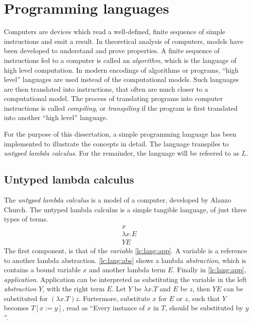 \documentclass[11pt,oneside,a4paper]{report}
\begin{document}
\chapter{Programming languages}
Computers are devices which read a well-defined, finite sequence of simple instructions and emit a result.
In theoretical analysis of computers, models have been developed to understand and prove properties.
A finite sequence of instructions fed to a computer is called an \textit{algorithm}, which is the language of high level computation\cite{copeland1997church}.
In modern encodings of algorithms or programs, ``high level'' languages are used instead of the computational models.
Such languages are then translated into instructions, that often are much closer to a computational model.
The process of translating programs into computer instructions is called \textit{compiling}, or \textit{transpiling} if the program is first translated into another ``high level'' language.

For the purpose of this dissertation, a simple programming language has been implemented to illustrate the concepts in detail.
The language transpiles to \textit{untyped lambda calculus}.
For the remainder, the language will be refeered to as $L$.

\section{Untyped lambda calculus}
The \textit{untyped lambda calculus} is a model of a computer, developed by Alanzo Church\cite{church1936unsolvable}.
The untyped lambda calculus is a simple tangible language, of just three types of terms.
\begin{align}
  &x
  \label{lc:lang:var}\\
  &\lambda x . E
  \label{lc:lang:abs}\\
  &Y E
  \label{lc:lang:app}
\end{align}
The first component, is that of the \textit{variable} \autoref{lc:lang:app}.
A variable is a reference to another lambda abstraction.
\autoref{lc:lang:abs} shows a lambda \textit{abstraction}, which is contains a bound variable $x$ and another lambda term $E$.
Finally in \autoref{lc:lang:app}, \textit{application}.
Application can be interpreted as substituting the variable in the left \textit{abstraction} $Y$, with the right term $E$.
Let $Y$ be $\lambda x . T$ and $E$ be $z$, then $Y E$ can be substituted for $(\lambda x . T) z$.
Furtermore, substitute $x$ for $E$ or $z$, such that $Y$ becomes $T[x := y]$, read as ``Every instance of $x$ in $T$, should be substituted by $y$''.
\end{document}
